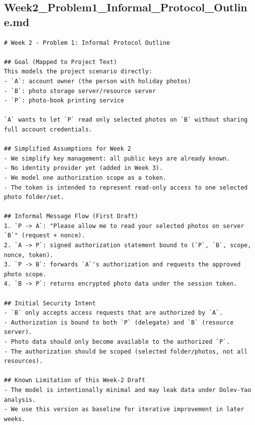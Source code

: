 \documentclass[11pt,a4paper]{article}
\begin{document}
\subsection{Week2\_Problem1\_Informal\_Protocol\_Outline.md}
\begin{lstlisting}
# Week 2 - Problem 1: Informal Protocol Outline

## Goal (Mapped to Project Text)
This models the project scenario directly:
- `A`: account owner (the person with holiday photos)
- `B`: photo storage server/resource server
- `P`: photo-book printing service

`A` wants to let `P` read only selected photos on `B` without sharing full account credentials.

## Simplified Assumptions for Week 2
- We simplify key management: all public keys are already known.
- No identity provider yet (added in Week 3).
- We model one authorization scope as a token.
- The token is intended to represent read-only access to one selected photo folder/set.

## Informal Message Flow (First Draft)
1. `P -> A`: "Please allow me to read your selected photos on server `B`" (request + nonce).
2. `A -> P`: signed authorization statement bound to (`P`, `B`, scope, nonce, token).
3. `P -> B`: forwards `A`'s authorization and requests the approved photo scope.
4. `B -> P`: returns encrypted photo data under the session token.

## Initial Security Intent
- `B` only accepts access requests that are authorized by `A`.
- Authorization is bound to both `P` (delegate) and `B` (resource server).
- Photo data should only become available to the authorized `P`.
- The authorization should be scoped (selected folder/photos, not all resources).

## Known Limitation of this Week-2 Draft
- The model is intentionally minimal and may leak data under Dolev-Yao analysis.
- We use this version as baseline for iterative improvement in later weeks.
\end{lstlisting}
\end{document}

